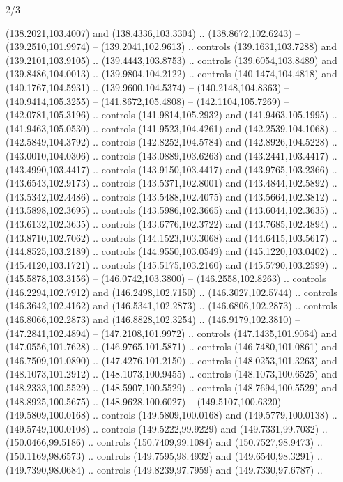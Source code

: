 \begin{flagdescription}{2/3}
\begin{scope}[xshift=0.5\flaglength,yshift=0.5\flagwidth,scale=\flagwidth/180]
\begin{scope}[y=0.8pt, x=0.8pt, yscale=-1,shift={(-168.75,-108.75)}]
  (138.2021,103.4007) and (138.4336,103.3304) .. (138.8672,102.6243) --
  (139.2510,101.9974) -- (139.2041,102.9613) .. controls (139.1631,103.7288) and
  (139.2101,103.9105) .. (139.4443,103.8753) .. controls (139.6054,103.8489) and
  (139.8486,104.0013) .. (139.9804,104.2122) .. controls (140.1474,104.4818) and
  (140.1767,104.5931) .. (139.9600,104.5374) -- (140.2148,104.8363) --
  (140.9414,105.3255) -- (141.8672,105.4808) -- (142.1104,105.7269) --
  (142.0781,105.3196) .. controls (141.9814,105.2932) and (141.9463,105.1995) ..
  (141.9463,105.0530) .. controls (141.9523,104.4261) and (142.2539,104.1068) ..
  (142.5849,104.3792) .. controls (142.8252,104.5784) and (142.8926,104.5228) ..
  (143.0010,104.0306) .. controls (143.0889,103.6263) and (143.2441,103.4417) ..
  (143.4990,103.4417) .. controls (143.9150,103.4417) and (143.9765,103.2366) ..
  (143.6543,102.9173) .. controls (143.5371,102.8001) and (143.4844,102.5892) ..
  (143.5342,102.4486) .. controls (143.5488,102.4075) and (143.5664,102.3812) ..
  (143.5898,102.3695) .. controls (143.5986,102.3665) and (143.6044,102.3635) ..
  (143.6132,102.3635) .. controls (143.6776,102.3722) and (143.7685,102.4894) ..
  (143.8710,102.7062) .. controls (144.1523,103.3068) and (144.6415,103.5617) ..
  (144.8525,103.2189) .. controls (144.9550,103.0549) and (145.1220,103.0402) ..
  (145.4120,103.1721) .. controls (145.5175,103.2160) and (145.5790,103.2599) ..
  (145.5878,103.3156) -- (146.0742,103.3800) -- (146.2558,102.8263) .. controls
  (146.2294,102.7912) and (146.2498,102.7150) .. (146.3027,102.5744) .. controls
  (146.3642,102.4162) and (146.5341,102.2873) .. (146.6806,102.2873) .. controls
  (146.8066,102.2873) and (146.8828,102.3254) .. (146.9179,102.3810) --
  (147.2841,102.4894) -- (147.2108,101.9972) .. controls (147.1435,101.9064) and
  (147.0556,101.7628) .. (146.9765,101.5871) .. controls (146.7480,101.0861) and
  (146.7509,101.0890) .. (147.4276,101.2150) .. controls (148.0253,101.3263) and
  (148.1073,101.2912) .. (148.1073,100.9455) .. controls (148.1073,100.6525) and
  (148.2333,100.5529) .. (148.5907,100.5529) .. controls (148.7694,100.5529) and
  (148.8925,100.5675) .. (148.9628,100.6027) -- (149.5107,100.6320) --
  (149.5809,100.0168) .. controls (149.5809,100.0168) and (149.5779,100.0138) ..
  (149.5749,100.0108) .. controls (149.5222,99.9229) and (149.7331,99.7032) ..
  (150.0466,99.5186) .. controls (150.7409,99.1084) and (150.7527,98.9473) ..
  (150.1169,98.6573) .. controls (149.7595,98.4932) and (149.6540,98.3291) ..
  (149.7390,98.0684) .. controls (149.8239,97.7959) and (149.7330,97.6787) ..

\end{scope}
\end{scope}
\end{flagdescription}

